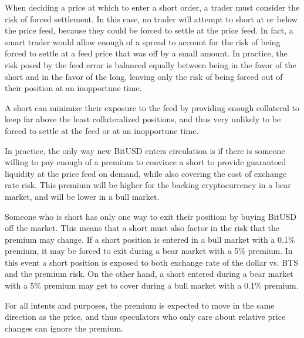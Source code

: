 When deciding a price at which to enter a short order, a trader must consider
the risk of forced settlement. In this case, no trader will attempt to short at
or below the price feed, because they could be forced to settle at the price
feed. In fact, a smart trader would allow enough of a spread to account for the
risk of being forced to settle at a feed price that was off by a small amount.
In practice, the risk posed by the feed error is balanced equally between being
in the favor of the short and in the favor of the long, leaving only the risk
of being forced out of their position at an inopportune time.

A short can minimize their exposure to the feed by providing enough collateral
to keep far above the least collateralized positions, and thus very unlikely to
be forced to settle at the feed or at an inopportune time.

In practice, the only way new BitUSD enters circulation is if there is someone
willing to pay enough of a premium to convince a short to provide guaranteed
liquidity at the price feed on demand, while also covering the cost of exchange
rate risk. This premium will be higher for the backing cryptocurrency in a bear
market, and will be lower in a bull market.

Someone who is short has only one way to exit their position: by buying BitUSD
off the market. This means that a short must also factor in the risk that the
premium may change. If a short position is entered in a bull market with a 0.1\%
premium, it may be forced to exit during a bear market with a 5\% premium. In
this event a short position is exposed to both exchange rate of the dollar vs.
BTS and the premium risk. On the other hand, a short entered during a bear
market with a 5\% premium may get to cover during a bull market with a 0.1\%
premium.

For all intents and purposes, the premium is expected to move in the same
direction as the price, and thus speculators who only care about relative price
changes can ignore the premium.
